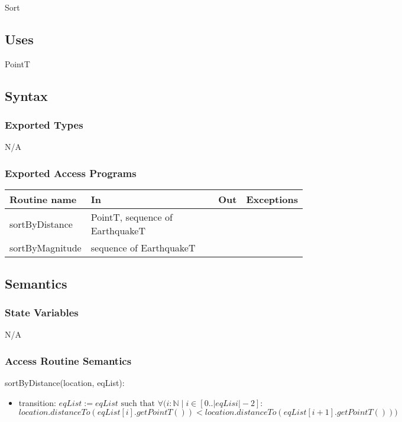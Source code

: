 \documentclass[12pt]{article}
\begin{document}
Sort

\subsection* {Uses}

PointT

\subsection* {Syntax}

\subsubsection* {Exported Types}

N/A


\subsubsection* {Exported Access Programs}

\begin{tabular}{| l | l | l | p{2cm} |}
\hline
\textbf{Routine name} & \textbf{In} & \textbf{Out} & \textbf{Exceptions}\\
\hline
sortByDistance & PointT, sequence of EarthquakeT &  & \\
\hline
sortByMagnitude & sequence of EarthquakeT &  & \\
\hline
\end{tabular}

\subsection* {Semantics}

\subsubsection* {State Variables}

N/A


\subsubsection* {Access Routine Semantics}

\noindent sortByDistance(location, eqList):
\begin{itemize}
\item transition: $\mathit{eqList} := eqList  
\mbox{ such that } \forall (i : \mathbb{N} \;|\; i \in [0..|eqLisi| - 2] :$ \\
 $location.distanceTo(eqList[i].getPointT()) < location.distanceTo(eqList[i + 1].getPointT()))$
\end{itemize}
\end{document}
